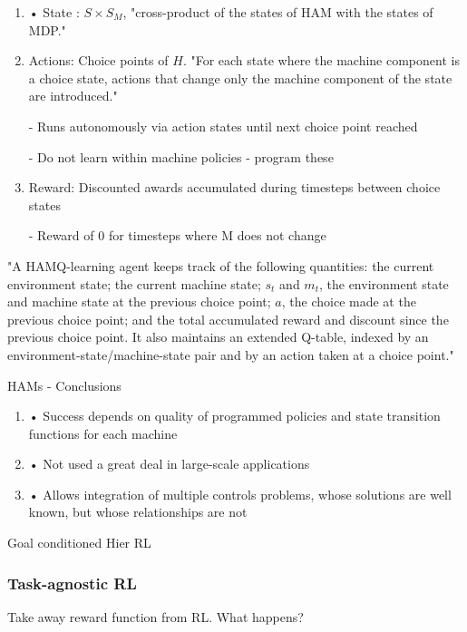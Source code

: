 \documentclass[english]{article}
\begin{document}
\begin{enumerate}
\item 
• State : $S \times S_M$, "cross-product of the states of HAM with the states of MDP."

\item  Actions: Choice points of $H$. "For each state where the machine component is a choice state,
actions that change only the machine component of the state are introduced."

- Runs autonomously via action states until next choice point reached

- Do not learn within machine policies - program these

\item  Reward: Discounted awards accumulated during timesteps
between choice states

- Reward of 0 for timesteps where M does not change
\end{enumerate}


"A HAMQ-learning agent keeps track of the following quantities:  the current environment
state; the current machine state; $s_t$ and $m_t$, the environment state and machine state at
the previous choice point; $a$, the choice made at the previous choice point; and the total accumulated reward and discount since the previous choice point. It also maintains
an extended Q-table, indexed by an environment-state/machine-state
pair and by an action taken at a choice point."

\item 
HAMs - Conclusions


\begin{enumerate}
\item 
• Success depends on quality of programmed policies and
state transition functions for each machine

\item • Not used a great deal in large-scale applications


\item  • Allows integration of multiple controls problems, whose
solutions are well known, but whose relationships are not
\end{enumerate}


\eenum

\item Goal conditioned Hier RL

\eenum 

\subsubsection{Task-agnostic RL}
%
\benum
\item Take away reward function from RL. What happens?
\end{document}
